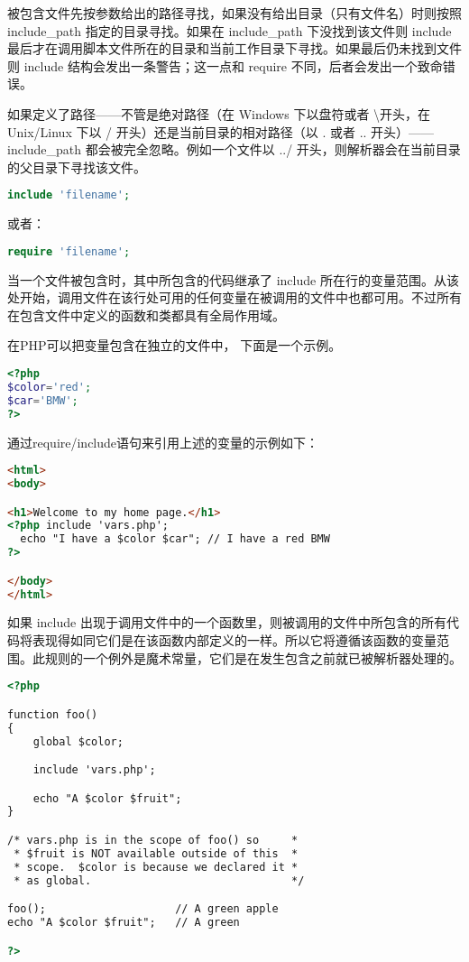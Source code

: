 被包含文件先按参数给出的路径寻找，如果没有给出目录（只有文件名）时则按照 include\_path 指定的目录寻找。如果在 include\_path 下没找到该文件则 include 最后才在调用脚本文件所在的目录和当前工作目录下寻找。如果最后仍未找到文件则 include 结构会发出一条警告；这一点和 require 不同，后者会发出一个致命错误。

如果定义了路径——不管是绝对路径（在 Windows 下以盘符或者 \textbackslash 开头，在 Unix/Linux 下以 / 开头）还是当前目录的相对路径（以 . 或者 .. 开头）——include\_path 都会被完全忽略。例如一个文件以 ../ 开头，则解析器会在当前目录的父目录下寻找该文件。

\begin{lstlisting}[language=PHP]
include 'filename';
\end{lstlisting}

或者：

\begin{lstlisting}[language=PHP]
require 'filename';
\end{lstlisting}

当一个文件被包含时，其中所包含的代码继承了 include 所在行的变量范围。从该处开始，调用文件在该行处可用的任何变量在被调用的文件中也都可用。不过所有在包含文件中定义的函数和类都具有全局作用域。





在PHP可以把变量包含在独立的文件中， 下面是一个示例。

\begin{lstlisting}[language=PHP]
<?php
$color='red';
$car='BMW';
?>
\end{lstlisting}


通过require/include语句来引用上述的变量的示例如下：


\begin{lstlisting}[language=HTML]
<html>
<body>

<h1>Welcome to my home page.</h1>
<?php include 'vars.php';
  echo "I have a $color $car"; // I have a red BMW
?>

</body>
</html>
\end{lstlisting}

如果 include 出现于调用文件中的一个函数里，则被调用的文件中所包含的所有代码将表现得如同它们是在该函数内部定义的一样。所以它将遵循该函数的变量范围。此规则的一个例外是魔术常量，它们是在发生包含之前就已被解析器处理的。

\begin{lstlisting}[language=HTML]
<?php

function foo()
{
    global $color;

    include 'vars.php';

    echo "A $color $fruit";
}

/* vars.php is in the scope of foo() so     *
 * $fruit is NOT available outside of this  *
 * scope.  $color is because we declared it *
 * as global.                               */

foo();                    // A green apple
echo "A $color $fruit";   // A green

?>
\end{lstlisting}

